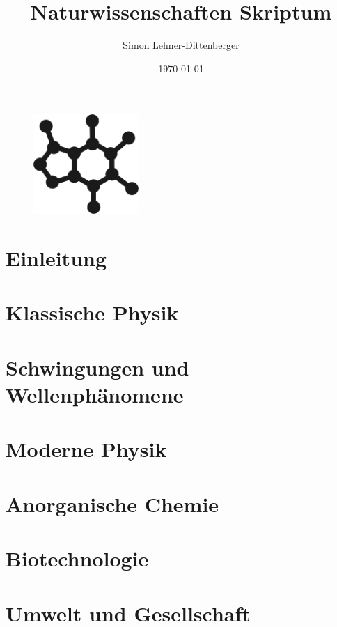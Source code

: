 \documentclass{article}
\title{Naturwissenschaften Skriptum}
\author{Simon Lehner-Dittenberger}
\date{ \today }
\begin{document}
\maketitle
\begin{figure}[bh]
\centering
\includegraphics[width=4cm]{caffeine.png}
\end{figure}
\newpage

\tableofcontents 
\newpage

 
\section{Einleitung}

\newpage
 
\section{Klassische Physik}

\newpage

\section{Schwingungen und Wellenphänomene}

\newpage

\section{Moderne Physik}

\newpage

\section{Anorganische Chemie}

\newpage

\section{Biotechnologie}

\newpage

\section{Umwelt und Gesellschaft}
 
\newpage
 
\end{document}
